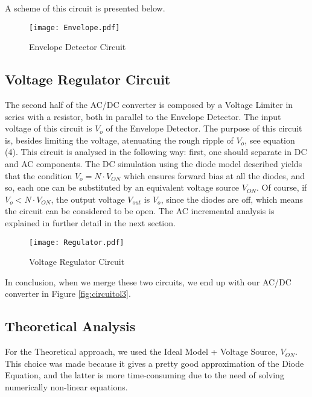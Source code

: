 A scheme of this circuit is presented below.

\begin{figure}[h]
    \centering
    \texttt{[image: Envelope.pdf]}
    \caption{Envelope Detector Circuit}
    \label{fig:envelope_detector}
\end{figure}

\clearpage

\subsection{Voltage Regulator Circuit}

The second half of the AC/DC converter is composed by a Voltage Limiter in series with a resistor, both in parallel to the Envelope Detector. The input voltage of this circuit is $V_o$ of the Envelope Detector. The purpose of this circuit is, besides limiting the voltage, atenuating the rough ripple of $V_o$, see equation (4). This circuit is analysed in the following way: first, one should separate in DC and AC components. The DC simulation using the diode model described yields that the condition $V_o=N\cdot V_{ON}$ which ensures forward bias at all the diodes, and so, each one can be substituted by an equivalent voltage source $V_{ON}$. Of course, if $V_o<N\cdot V_{ON}$, the output voltage $V_{out}$ is $V_o$, since the diodes are off, which means the circuit can be considered to be open. The AC incremental analysis is explained in further detail in the next section.

\begin{figure}[h]
    \centering
    \texttt{[image: Regulator.pdf]}
    \caption{Voltage Regulator Circuit}
    \label{fig:Regulator}
\end{figure}

In conclusion, when we merge these two circuits, we end up with our AC/DC converter in Figure \ref{fig:circuitol3}.

\clearpage

\subsection{Theoretical Analysis}
\label{subsec:Req}

For the Theoretical approach, we used the Ideal Model + Voltage Source, $V_{ON}$. This choice was made because it gives a pretty good approximation of the Diode Equation, and the latter is more time-consuming due to the need of solving numerically non-linear equations.

